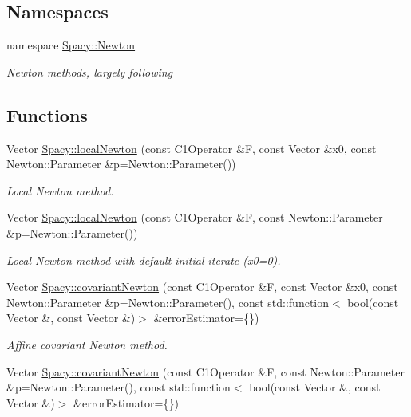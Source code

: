 \subsection*{\-Namespaces}
\begin{DoxyCompactItemize}
\item 
namespace \hyperlink{namespaceSpacy_1_1Newton}{\-Spacy\-::\-Newton}
\begin{DoxyCompactList}\small\item\em \-Newton methods, largely following \end{DoxyCompactList}\end{DoxyCompactItemize}
\subsection*{\-Functions}
\begin{DoxyCompactItemize}
\item 
\-Vector \hyperlink{group__NewtonGroup_ga448b8e78b2e84ed78e70c42114ea7599}{\-Spacy\-::local\-Newton} (const \-C1\-Operator \&\-F, const \-Vector \&x0, const \-Newton\-::\-Parameter \&p=\-Newton\-::\-Parameter())
\begin{DoxyCompactList}\small\item\em \-Local \-Newton method. \end{DoxyCompactList}\item 
\-Vector \hyperlink{group__NewtonGroup_gafbe5e25f46f7b0d237f5e9971cef998a}{\-Spacy\-::local\-Newton} (const \-C1\-Operator \&\-F, const \-Newton\-::\-Parameter \&p=\-Newton\-::\-Parameter())
\begin{DoxyCompactList}\small\item\em \-Local \-Newton method with default initial iterate (x0=0). \end{DoxyCompactList}\item 
\-Vector \hyperlink{group__NewtonGroup_ga6c18ad252cb530e4f6734eb4e4fda481}{\-Spacy\-::covariant\-Newton} (const \-C1\-Operator \&\-F, const \-Vector \&x0, const \-Newton\-::\-Parameter \&p=\-Newton\-::\-Parameter(), const std\-::function$<$ bool(const \-Vector \&, const \-Vector \&)$>$ \&error\-Estimator=\{\})
\begin{DoxyCompactList}\small\item\em \-Affine covariant \-Newton method. \end{DoxyCompactList}\item 
\-Vector \hyperlink{group__NewtonGroup_ga2d469322482680319bf81d865ed57068}{\-Spacy\-::covariant\-Newton} (const \-C1\-Operator \&\-F, const \-Newton\-::\-Parameter \&p=\-Newton\-::\-Parameter(), const std\-::function$<$ bool(const \-Vector \&, const \-Vector \&)$>$ \&error\-Estimator=\{\})

\end{DoxyCompactItemize}
